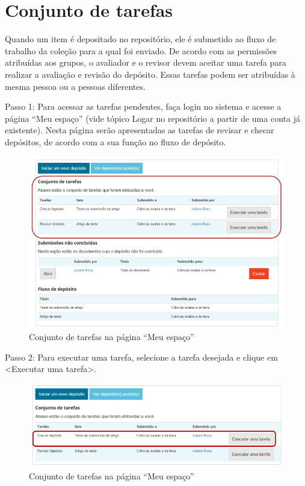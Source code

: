 \documentclass[12pt,hidelinks]{article}
\begin{document}
\newpage
\section{Conjunto de tarefas}
\newpage
    
    Quando um item é depositado no repositório, ele é submetido ao fluxo de trabalho da coleção para a qual foi enviado. De acordo com as permissões atribuídas aos grupos, o avaliador e o revisor devem aceitar uma tarefa para realizar a avaliação e revisão do depósito. Essas tarefas podem ser atribuídas à mesma pessoa ou a pessoas diferentes.
    
    \singlespacing
    
    Passo 1: Para acessar as tarefas pendentes, faça login no sistema e acesse a página “Meu espaço” (vide tópico Logar no repositório a partir de uma conta já existente). Nesta página serão apresentadas as tarefas de revisar e checar depósitos, de acordo com a sua função no fluxo de depósito.
    
    \begin{figure}[!htp]
                \centering
                \includegraphics[scale=0.8]{figura/Figura169.png}
                \caption{Conjunto de tarefas na página “Meu espaço”}
            \label{Rotulo}
        \end{figure}

\newpage

    Passo 2: Para executar uma tarefa, selecione a tarefa desejada e clique em <Executar uma tarefa>. 
    
    \begin{figure}[!htp]
                \centering
                \includegraphics[scale=0.7]{figura/Figura170.png}
                \caption{Conjunto de tarefas na página “Meu espaço”}
            \label{Rotulo}
        \end{figure}
    
\end{document}
